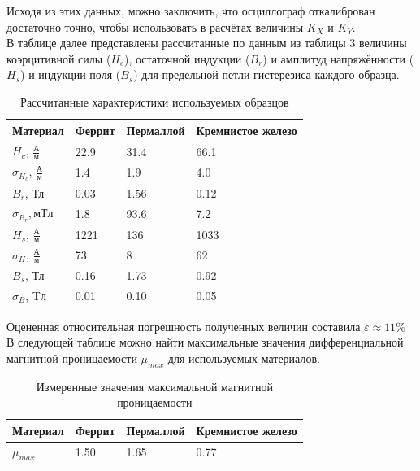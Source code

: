 \documentclass[12pt, letterpaper, oneside]{article}
\begin{document}
Исходя из этих данных, можно заключить, что осциллограф откалиброван достаточно точно, чтобы использовать в расчётах величины $K_X$ и $K_Y$.\\
В таблице далее представлены рассчитанные по данным из таблицы 3 величины коэрцитивной силы ($H_c$), остаточной индукции ($B_r$) и амплитуд напряжённости ($H_s$) и индукции поля ($B_s$) для предельной петли гистерезиса каждого образца.\\
\begin{table}[H]
\centering
\caption{Рассчитанные характеристики используемых образцов}
\begin{tabular}{|l|l|l|l|}
\hline
Материал                & Феррит & Пермаллой & Кремнистое железо \\ \hline
$H_c$, $\frac{А}{м}$ & 22.9   & 31.4       & 66.1              \\ \hline
$\sigma_{H_c}$, $\frac{А}{м}$    & 1.4    & 1.9       & 4.0              \\ \hline
$B_r$, Тл    & 0.03    & 1.56       & 0.12              \\ \hline
$\sigma_{B_r}, мТл$    & 1.8    & 93.6       & 7.2              \\ \hline
$H_{s}$, $\frac{А}{м}$ & 1221   & 136       & 1033              \\ \hline
$\sigma_H$, $\frac{А}{м}$    & 73    & 8       & 62              \\ \hline
$B_{s}$, Тл    & 0.16    & 1.73       & 0.92              \\ \hline
$\sigma_B$, Tл    & 0.01    & 0.10       & 0.05              \\ \hline
\end{tabular}
\end{table}\noindent
Оцененная относительная погрешность полученных величин составила $\varepsilon ≈ 11\%$\\
В следующей таблице можно найти максимальные значения дифференциальной магнитной проницаемости $\mu_{max}$ для используемых материалов.\\
\begin{table}[H]
\caption{Измеренные значения максимальной магнитной проницаемости}
\centering
\begin{tabular}{|l|l|l|l|}
\hline
Материал & Феррит & Пермаллой & Кремнистое железо \\
\hline
$\mu_{max}$ & 1.50 & 1.65 & 0.77 \\
\hline
\end{tabular}
\end{table}\noindent
\end{document}
